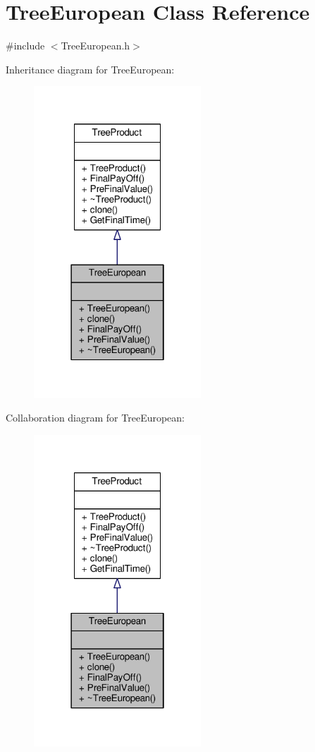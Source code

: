 \hypertarget{classTreeEuropean}{}\section{Tree\+European Class Reference}
\label{classTreeEuropean}


{\ttfamily \#include $<$Tree\+European.\+h$>$}



Inheritance diagram for Tree\+European\+:
\nopagebreak
\begin{figure}[H]
\begin{center}
\leavevmode
\includegraphics[width=178pt]{classTreeEuropean__inherit__graph}
\end{center}
\end{figure}


Collaboration diagram for Tree\+European\+:
\nopagebreak
\begin{figure}[H]
\begin{center}
\leavevmode
\includegraphics[width=178pt]{classTreeEuropean__coll__graph}
\end{center}
\end{figure}
